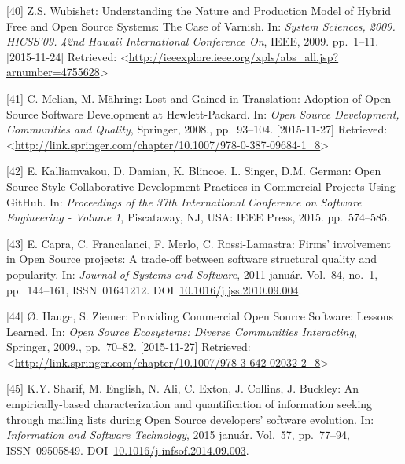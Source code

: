 \documentclass[12pt,magyar,a4paper,oneside]{scrreprt}
\begin{document}
\leavevmode\hypertarget{ref-wubishet_understanding_2009}{}%
{[}40{]} Z.S. Wubishet: Understanding the Nature and Production Model of
Hybrid Free and Open Source Systems: The Case of Varnish. In:
\emph{System Sciences, 2009. HICSS'09. 42nd Hawaii International
Conference On}, IEEE, 2009. pp.~1--11. {[}2015-11-24{]} Retrieved:
\textless{}\url{http://ieeexplore.ieee.org/xpls/abs_all.jsp?arnumber=4755628}\textgreater{}

\leavevmode\hypertarget{ref-melian_lost_2008}{}%
{[}41{]} C. Melian, M. Mähring: Lost and Gained in Translation: Adoption
of Open Source Software Development at Hewlett-Packard. In: \emph{Open
Source Development, Communities and Quality}, Springer, 2008.,
pp.~93--104. {[}2015-11-27{]} Retrieved:
\textless{}\url{http://link.springer.com/chapter/10.1007/978-0-387-09684-1_8}\textgreater{}

\leavevmode\hypertarget{ref-kalliamvakou_open_2015}{}%
{[}42{]} E. Kalliamvakou, D. Damian, K. Blincoe, L. Singer, D.M. German:
Open Source-Style Collaborative Development Practices in Commercial
Projects Using GitHub. In: \emph{Proceedings of the 37th International
Conference on Software Engineering - Volume 1}, Piscataway, NJ, USA:
IEEE Press, 2015. pp.~574--585.

\leavevmode\hypertarget{ref-capra_firms_2011}{}%
{[}43{]} E. Capra, C. Francalanci, F. Merlo, C. Rossi-Lamastra: Firms'
involvement in Open Source projects: A trade-off between software
structural quality and popularity. In: \emph{Journal of Systems and
Software}, 2011 január. Vol.~84, no.~1, pp.~144--161, ISSN~01641212.
DOI~\href{https://doi.org/10.1016/j.jss.2010.09.004}{10.1016/j.jss.2010.09.004}.

\leavevmode\hypertarget{ref-hauge_providing_2009}{}%
{[}44{]} Ø. Hauge, S. Ziemer: Providing Commercial Open Source Software:
Lessons Learned. In: \emph{Open Source Ecosystems: Diverse Communities
Interacting}, Springer, 2009., pp.~70--82. {[}2015-11-27{]} Retrieved:
\textless{}\url{http://link.springer.com/chapter/10.1007/978-3-642-02032-2_8}\textgreater{}

\leavevmode\hypertarget{ref-sharif_empirically-based_2015}{}%
{[}45{]} K.Y. Sharif, M. English, N. Ali, C. Exton, J. Collins, J.
Buckley: An empirically-based characterization and quantification of
information seeking through mailing lists during Open Source developers'
software evolution. In: \emph{Information and Software Technology}, 2015
január. Vol.~57, pp.~77--94, ISSN~09505849.
DOI~\href{https://doi.org/10.1016/j.infsof.2014.09.003}{10.1016/j.infsof.2014.09.003}.
\end{document}
